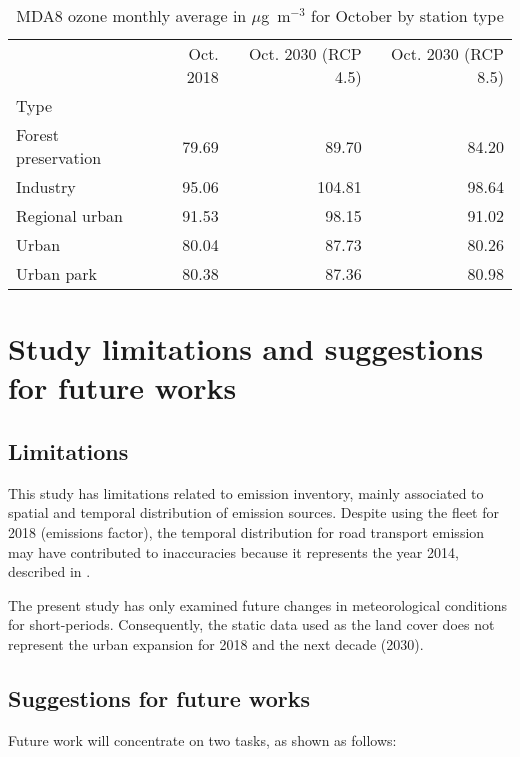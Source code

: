 \begin{table}
\centering
\caption{MDA8 ozone monthly average in $\mu$g~m$^{-3}$ for October by station type}
\label{tab:o3_oct_type}
\begin{tabular}{lrrr}
\toprule
{} &  Oct. 2018 &  Oct. 2030 (RCP 4.5) &  Oct. 2030 (RCP 8.5) \\
Type                &            &                      &                       \\
\midrule
Forest preservation &      79.69 &                89.70 &                 84.20 \\
Industry            &      95.06 &               104.81 &                 98.64 \\
Regional urban      &      91.53 &                98.15 &                 91.02 \\
Urban               &      80.04 &                87.73 &                 80.26 \\
Urban park          &      80.38 &                87.36 &                 80.98 \\
\bottomrule
\end{tabular}
\end{table}

\section{Study limitations and suggestions for future works}
\subsection{Limitations}
This study has limitations related to emission inventory, mainly associated to spatial and temporal distribution of emission sources.
Despite using the fleet for 2018 (emissions factor), the temporal distribution for road transport emission may have contributed to inaccuracies because it represents the year 2014, described in \citet{Andrade2015}.


The present study has only examined future changes in meteorological conditions for short-periods.
Consequently, the static data used as the land cover does not represent the urban expansion for 2018 and the next decade (2030).

\subsection{Suggestions for future works}
Future work will concentrate on two tasks, as shown as follows:

